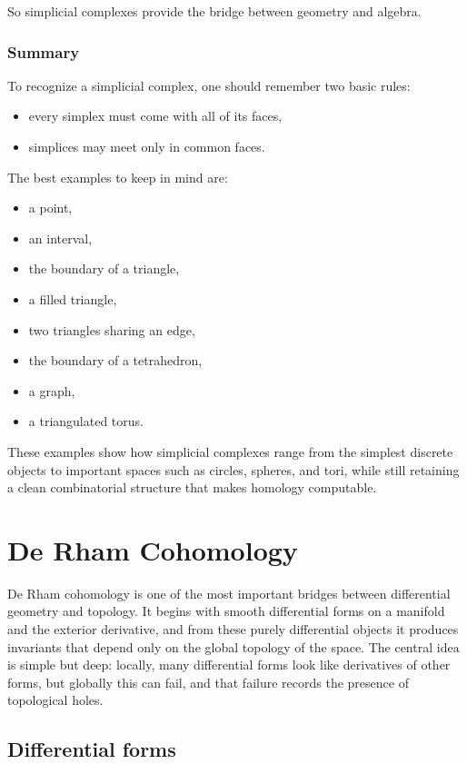 \documentclass[12pt,a4paper]{article}
\theoremstyle{notespace}
\begin{document}
So simplicial complexes provide the bridge between geometry and algebra.

\subsubsection{Summary}

To recognize a simplicial complex, one should remember two basic rules:
\begin{itemize}
	\item every simplex must come with all of its faces,
	\item simplices may meet only in common faces.
\end{itemize}

The best examples to keep in mind are:
\begin{itemize}
	\item a point,
	\item an interval,
	\item the boundary of a triangle,
	\item a filled triangle,
	\item two triangles sharing an edge,
	\item the boundary of a tetrahedron,
	\item a graph,
	\item a triangulated torus.
\end{itemize}

These examples show how simplicial complexes range from the simplest discrete objects to important spaces such as circles, spheres, and tori, while still retaining a clean combinatorial structure that makes homology computable.


\section{De Rham Cohomology}

De Rham cohomology is one of the most important bridges between differential geometry and topology. It begins with smooth differential forms on a manifold and the exterior derivative, and from these purely differential objects it produces invariants that depend only on the global topology of the space. The central idea is simple but deep: locally, many differential forms look like derivatives of other forms, but globally this can fail, and that failure records the presence of topological holes.

\subsection{Differential forms}
\end{document}
